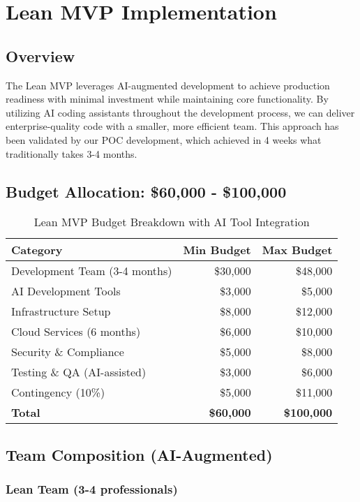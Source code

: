 \documentclass[12pt,a4paper]{report}
\begin{document}
\chapter{Lean MVP Implementation}

\section{Overview}

The Lean MVP leverages AI-augmented development to achieve production readiness with minimal investment while maintaining core functionality. By utilizing AI coding assistants throughout the development process, we can deliver enterprise-quality code with a smaller, more efficient team. This approach has been validated by our POC development, which achieved in 4 weeks what traditionally takes 3-4 months.

\section{Budget Allocation: \$60,000 - \$100,000}

\begin{table}[H]
\centering
\begin{tabularx}{\textwidth}{|X|r|r|}
\hline
\textbf{Category} & \textbf{Min Budget} & \textbf{Max Budget} \\
\hline
Development Team (3-4 months) & \$30,000 & \$48,000 \\
AI Development Tools & \$3,000 & \$5,000 \\
Infrastructure Setup & \$8,000 & \$12,000 \\
Cloud Services (6 months) & \$6,000 & \$10,000 \\
Security \& Compliance & \$5,000 & \$8,000 \\
Testing \& QA (AI-assisted) & \$3,000 & \$6,000 \\
Contingency (10\%) & \$5,000 & \$11,000 \\
\hline
\textbf{Total} & \textbf{\$60,000} & \textbf{\$100,000} \\
\hline
\end{tabularx}
\caption{Lean MVP Budget Breakdown with AI Tool Integration}
\end{table}

\section{Team Composition (AI-Augmented)}

\subsection{Lean Team (3-4 professionals)}
\end{document}
